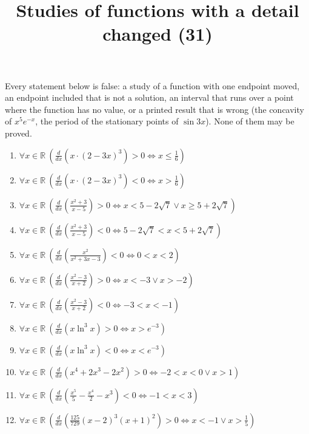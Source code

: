 \documentclass[11pt,a4paper]{article}
\title{Studies of functions with a detail changed (31)}
\author{}
\date{}
\begin{document}
\maketitle
Every statement below is false: a study of a function with one endpoint moved, an endpoint included that is not a solution, an interval that runs over a point where the function has no value, or a printed result that is wrong (the concavity of $x^{5}e^{-x}$, the period of the stationary points of $\sin 3x$). None of them may be proved.

\begin{enumerate}
\item $\displaystyle \forall x \in \mathbb{R}\ \left(\frac{d}{dx}\left( x \cdot (2 - 3x)^{3} \right) > 0 \iff x \le \frac{1}{6}\right)$
\item $\displaystyle \forall x \in \mathbb{R}\ \left(\frac{d}{dx}\left( x \cdot (2 - 3x)^{3} \right) < 0 \iff x > \frac{1}{6}\right)$
\item $\displaystyle \forall x \in \mathbb{R}\ \left(\frac{d}{dx}\left( \frac{x^{2} + 3}{x - 5} \right) > 0 \iff x < 5 - 2\sqrt{7} \lor x \ge 5 + 2\sqrt{7}\right)$
\item $\displaystyle \forall x \in \mathbb{R}\ \left(\frac{d}{dx}\left( \frac{x^{2} + 3}{x - 5} \right) < 0 \iff 5 - 2\sqrt{7} < x < 5 + 2\sqrt{7}\right)$
\item $\displaystyle \forall x \in \mathbb{R}\ \left(\frac{d}{dx}\left( \frac{x^{2}}{x^{2} + 3x - 3} \right) < 0 \iff 0 < x < 2\right)$
\item $\displaystyle \forall x \in \mathbb{R}\ \left(\frac{d}{dx}\left( \frac{x^{2} - 3}{x + 2} \right) > 0 \iff x < -3 \lor x > -2\right)$
\item $\displaystyle \forall x \in \mathbb{R}\ \left(\frac{d}{dx}\left( \frac{x^{2} - 3}{x + 2} \right) < 0 \iff -3 < x < -1\right)$
\item $\displaystyle \forall x \in \mathbb{R}\ \left(\frac{d}{dx}\left( x\ln^{3} x \right) > 0 \iff x > e^{-3}\right)$
\item $\displaystyle \forall x \in \mathbb{R}\ \left(\frac{d}{dx}\left( x\ln^{3} x \right) < 0 \iff x < e^{-3}\right)$
\item $\displaystyle \forall x \in \mathbb{R}\ \left(\frac{d}{dx}\left( x^{4} + 2x^{3} - 2x^{2} \right) > 0 \iff -2 < x < 0 \lor x > 1\right)$
\item $\displaystyle \forall x \in \mathbb{R}\ \left(\frac{d}{dx}\left( \frac{x^{5}}{5} - \frac{x^{4}}{2} - x^{3} \right) < 0 \iff -1 < x < 3\right)$
\item $\displaystyle \forall x \in \mathbb{R}\ \left(\frac{d}{dx}\left( \frac{125}{729}(x - 2)^{3}(x + 1)^{2} \right) > 0 \iff x < -1 \lor x > \frac{1}{5}\right)$

\end{enumerate}
\end{document}
